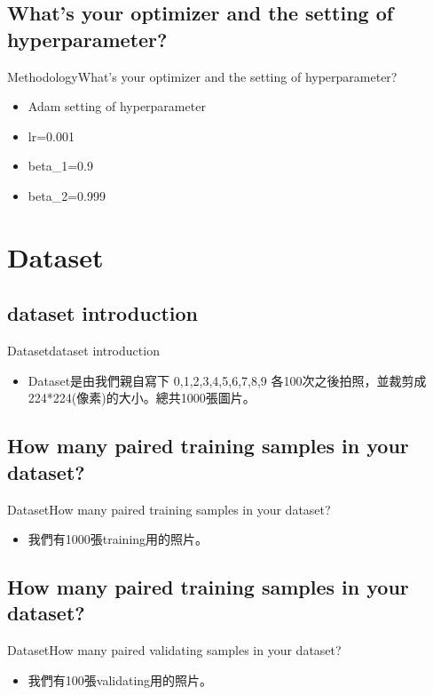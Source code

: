 \documentclass{beamer}
\begin{document}
\begin{CJK*}{UTF8}{bsmi}
\subsection*{What’s your optimizer and the setting of hyperparameter?}
\begin{frame}{Methodology}{What’s your optimizer and the setting of hyperparameter?}
  \begin{itemize}
  optimizer
  \item {
  Adam  
  }
  setting of hyperparameter
  \item {
  lr=0.001
  }
  \item {
  beta_1=0.9
  }
  \item {
  beta_2=0.999
  }
  \end{itemize}
\end{frame}

\section{Dataset}
\subsection*{dataset introduction}
\begin{frame}{Dataset}{dataset introduction}
  \begin{itemize}
  \item {
   Dataset是由我們親自寫下 0,1,2,3,4,5,6,7,8,9 各100次之後拍照，並裁剪成 224*224(像素)的大小。總共1000張圖片。
  }
  \end{itemize}
\end{frame}
\subsection*{How many paired training samples in your dataset?}
\begin{frame}{Dataset}{How many paired training samples in your dataset?}
  \begin{itemize}
  \item {
   我們有1000張training用的照片。
  }
  \end{itemize}
\end{frame}
\subsection*{How many paired training samples in your dataset?}
\begin{frame}{Dataset}{How many paired validating samples in your dataset?}
  \begin{itemize}
  \item {
   我們有100張validating用的照片。
  }
  \end{itemize}
\end{frame}


\end{CJK*}
\end{document}
